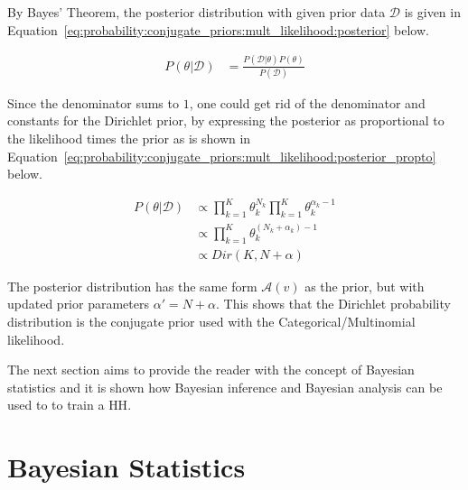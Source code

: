 By Bayes' Theorem, the posterior distribution with given prior data $\mathcal{D}$ is given in Equation~\eqref{eq:probability:conjugate_priors:mult_likelihood:posterior} below.

\begin{equation}
      \label{eq:probability:conjugate_priors:mult_likelihood:posterior}
      \begin{split}
            P(\theta \vert \mathcal{D}) &= \frac{P(\mathcal{D} \vert \theta) P(\theta)}{P(\mathcal{D})}
      \end{split}
\end{equation}

Since the denominator sums to $1$, one could get rid of the denominator and constants for the Dirichlet prior, by expressing the posterior as proportional to the likelihood times the prior as is shown in Equation~\eqref{eq:probability:conjugate_priors:mult_likelihood:posterior_propto} below.

\begin{equation}
      \label{eq:probability:conjugate_priors:mult_likelihood:posterior_propto}
      \begin{split}
            P(\theta \vert \mathcal{D}) &\propto \prod_{k=1}^{K} \theta_{k}^{N_{k}} \prod_{k=1}^{K} \theta_{k}^{\alpha_{k} - 1}\\
            &\propto \prod_{k=1}^{K} \theta_{k}^{(N_{k} + \alpha_{k}) - 1} \\
            &\propto Dir(K, N + \alpha)
      \end{split}
\end{equation}

The posterior distribution has the same form $\mathcal{A}(v)$ as the prior, but with updated prior parameters $\alpha' = N + \alpha$. This shows that the Dirichlet probability distribution is the conjugate prior used with the Categorical/Multinomial likelihood.

The next section aims to provide the reader with the concept of Bayesian statistics and it is shown how Bayesian inference and Bayesian analysis can be used to to train a \acs{HH}.


\section{Bayesian Statistics}
\label{sec:probability:bayesian_statistics}

